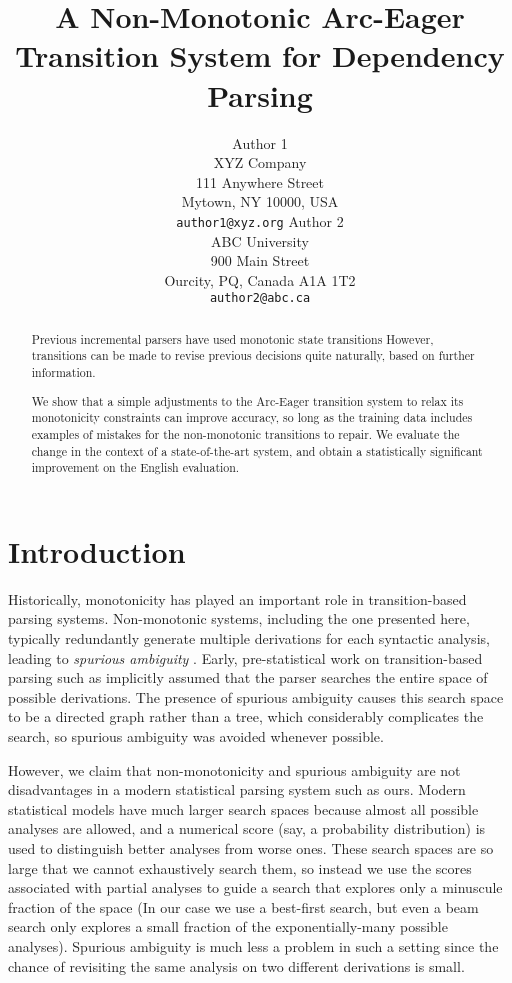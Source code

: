 \documentclass[11pt,letterpaper]{article}
\title{A Non-Monotonic Arc-Eager Transition System for Dependency Parsing}
\author{Author 1\\
	    XYZ Company\\
	    111 Anywhere Street\\
	    Mytown, NY 10000, USA\\
	    {\tt author1@xyz.org}
	  \And
	Author 2\\
  	ABC University\\
  	900 Main Street\\
  	Ourcity, PQ, Canada A1A 1T2\\
  {\tt author2@abc.ca}}
\date{}
\begin{document}
\maketitle
\begin{abstract}
    Previous incremental parsers have used monotonic state transitions
    However, transitions can be made to revise
    previous decisions quite naturally, based on further information.

    We show that a simple adjustments to the Arc-Eager transition system to relax its
    monotonicity constraints can improve accuracy, so long as the training data
    includes examples of mistakes for the non-monotonic transitions to repair.
    We evaluate the change in the context of a state-of-the-art system, and
    obtain a statistically significant improvement on the English
    evaluation.
\end{abstract}

\section{Introduction}


Historically, monotonicity has played an important role in transition-based parsing
systems.  Non-monotonic systems, including the one presented here, typically
redundantly generate multiple derivations for each syntactic analysis, leading to
{\em spurious ambiguity} \citep{Steedman00b}.  Early, pre-statistical work on transition-based
parsing such as \citet{Abney91} implicitly assumed that the parser searches the
entire space of possible derivations. The presence of spurious ambiguity causes
this search space to be a directed graph rather than a tree, which considerably
complicates the search, so spurious ambiguity was avoided whenever possible.

However, we claim that non-monotonicity and spurious ambiguity are not disadvantages in a
modern statistical parsing system such as ours.  Modern statistical models have
much larger search spaces because almost all possible analyses are allowed, and
a numerical score (say, a probability distribution) is used to distinguish better
analyses from worse ones.  These search spaces are so large that we cannot
exhaustively search them, so instead we use the scores associated with partial
analyses to guide a search that explores only a minuscule fraction of the space
(In our case we use a best-first search, but even a beam search only explores
a small fraction of the exponentially-many possible analyses). Spurious ambiguity
is much less a problem in such a setting since the chance of revisiting the same
analysis on two different derivations is small.
\end{document}
